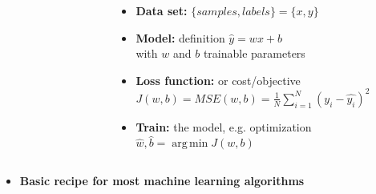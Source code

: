 \documentclass[aspectratio=169]{beamer}
\DeclareMathOperator*{\argmin}{arg\,min}
\begin{document}
\begin{frame}
\begin{columns}
\begin{column}{0.43\textwidth}
\begin{figure}
            \end{figure}
        \end{column}
        \begin{column}{0.53\textwidth}
            \begin{itemize}
                \item<1-> \textbf{Data set:} $\{samples, labels\}=\{x, y\}$
                \item<2-> \textbf{Model:} definition $\hat{y}=wx+b$\\ with $w$ and $b$ trainable parameters
                \item<3-> \textbf{Loss function:} or cost/objective\\
                $J(w,b)=MSE(w,b)=\frac{1}{N}\sum_{i=1}^{N}(y_i-\hat{y_i})^2$
                \item<4-> \textbf{Train:} the model, e.g. optimization\\
                $\hat{w}, \hat{b}=\argmin J(w, b)$ \\
                
            \end{itemize}
        \end{column}
    \end{columns}

    \bigskip
    \begin{itemize}
        \item<5>
            \begin{center}
                \textbf{Basic recipe for most machine learning algorithms}
            \end{center}
    \end{itemize}
\end{frame}
\end{document}
